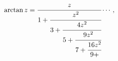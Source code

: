 \[\mathop{\mathrm{arctan}\/}\nolimits z=\cfrac{z}{1+\cfrac{z^{2}}{3+\cfrac{4z^{2%
}}{5+\cfrac{9z^{2}}{7+\cfrac{16z^{2}}{9+}}}}}\cdots,\]